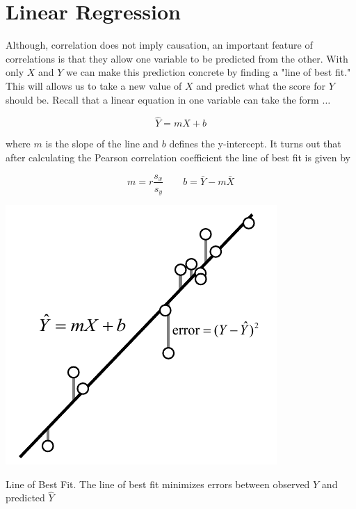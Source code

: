 \documentclass{tufte-handout}
\begin{document}
\section{Linear Regression}

Although, correlation does not imply causation, an important feature of correlations is that they allow one variable to be predicted from the other. With only $X$ and $Y$ we can make this prediction concrete by finding a "line of best fit." This will allows us to take a new value of $X$ and predict what the score for $Y$ should be. Recall that a linear equation in one variable can take the form $\dots$

\begin{equation*}
\hat{Y}=mX+b
\end{equation*}

where $m$ is the slope of the line and $b$ defines the y-intercept. It turns out that after calculating the Pearson correlation coefficient the line of best fit is given by

\begin{equation*}
m=r\frac{s_x}{s_y} \qquad b=\bar{Y}-m\bar{X}
\end{equation*}


\begin{marginfigure}[10pt]
  \includegraphics[width=\linewidth]{handout8_bestfit}%
  \label{fig:fullfig}%
\caption{Line of Best Fit. The line of best fit minimizes errors between observed $Y$ and predicted $\hat{Y}$}
\end{marginfigure}
\end{document}
